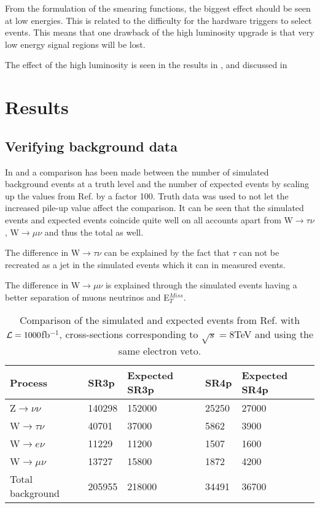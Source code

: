 From the formulation of the smearing functions, the biggest effect should be seen at low energies. This is related to the difficulty for the hardware triggers to select events. This means that one drawback of the high luminosity upgrade is that very low energy signal regions will be lost.

The effect of the high luminosity is seen in the results in ,  and discussed in 

\newpage
\section{Results}\label{chap:sig:sec:res}
\subsection{Verifying background data}\label{Verifying background data}
In  and   a comparison has been made between the number of simulated background events at a truth level and the number of expected events by scaling up the values from Ref. \citep{ATLAS-CONF-2012-147} by a factor 100. Truth data was used to not let the increased pile-up value affect the comparison. It can be seen that the simulated events and expected events coincide quite well on all accounts apart from W$\rightarrow\tau\nu$, W$\rightarrow\mu\nu$ and thus the total as well. 

The difference in W$\rightarrow\tau\nu$ can be explained by the fact that $\tau$ can not be recreated as a jet in the simulated events which it can in measured events.

The difference in W$\rightarrow\mu\nu$ is explained through the simulated events having a better separation of muons neutrinos and E$_T^{Miss}$.

\begin{table}[ht]
\begin{center}
\begin{tabular}{|l|l|l|l|l|}
\hline
Process & SR3p & Expected SR3p & SR4p & Expected SR4p \\ \hline
Z$\rightarrow\nu\nu$ & 140298 & 152000 & 25250 & 27000 \\
W$\rightarrow\tau\nu$ & 40701 & 37000 & 5862 & 3900 \\
W$\rightarrow e\nu$ & 11229 & 11200 & 1507 & 1600 \\
W$\rightarrow\mu\nu$ & 13727 & 15800 & 1872 & 4200 \\ \hline
Total background & 205955 & 218000 & 34491 & 36700 \\ \hline
\end{tabular}
\caption{Comparison of the simulated and expected events from Ref. \citep{ATLAS-CONF-2012-147} with $\mathcal{L}=1000$fb$^{-1}$, cross-sections corresponding to $\sqrt{s}=8$TeV and using the same electron veto.}
\label{tab:Compare1}
\end{center}
\end{table}

